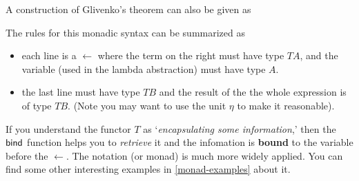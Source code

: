 A construction of Glivenko's theorem can also be given as

The rules for this monadic syntax can be summarized as
\begin{itemize}
    \item each line is a $\leftarrow$ where the term on the
    right must have type $TA$, and the variable (used in the lambda
    abstraction) must have type $A$. 
    \item the last line must have type $TB$ and the result of the 
    the whole expression is of type $TB$. (Note you may want to use
    the unit $\eta$ to make it reasonable).
\end{itemize}

If you understand the functor $T$ as `{\it encapsulating some 
information},' then the $\text{\sf bind}$ function helps you to {\it retrieve}
it and the infomation is {\bf bound} to the variable before the 
$\leftarrow$. The notation (or monad) is much more widely applied.
You can find some other interesting examples in \autoref{monad-examples} about it. 
